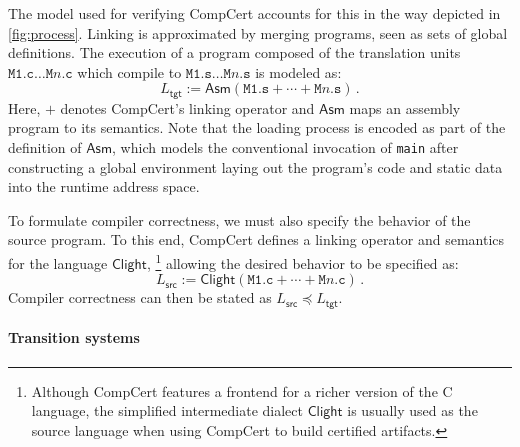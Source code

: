 \documentclass[sigplan,10pt,review]{acmart}
\newcommand{\kw}[1]{\ensuremath{ \mathsf{#1} }}
\newcommand{\refby}{\preceq}
\newcommand{\opt}[2]{#1}
\newcommand{\opt}[2]{#2}
\begin{document}
The model used for verifying CompCert accounts for this
\opt{in the way depicted in \autoref{fig:process}.}%
    {in the following way.}
Linking is approximated by
merging programs, seen as sets of global definitions.
The execution
of a program composed of the translation units
$\texttt{M1.c} \ldots \texttt{M$n$.c}$
which compile to
$\texttt{M1.s} \ldots \texttt{M$n$.s}$
is modeled as:
\[
    L_\kw{tgt} :=
    \kw{Asm}(\texttt{M1.s} +
             \cdots +
             \texttt{M$n$.s}) \,.
\]
Here,
$+$ denotes CompCert's linking operator and
$\kw{Asm}$ maps an assembly program to its semantics.
Note that the loading process is encoded
as part of the definition of $\kw{Asm}$,
which models the conventional invocation of \texttt{main}
after constructing a global environment
laying out the program's code and static data
into the runtime address space.

To formulate compiler correctness,
we must also specify the behavior of the source program.
To this end,
CompCert defines a linking operator
and semantics
for the language $\kw{Clight}$,%
\footnote{
  Although CompCert features a frontend for a richer version
  of the C language,
  the simplified intermediate dialect \kw{Clight}
  is usually used as the source language
  when using CompCert to build certified artifacts.
}
allowing the desired behavior to be specified as:
\[
    L_\kw{src} :=
    \kw{Clight}(\texttt{M1.c} + \cdots + \texttt{M$n$.c}) \,.
\]
Compiler correctness
can then be stated as $L_\kw{src} \refby L_\kw{tgt}$.

\paragraph{Transition systems} %
\end{document}
